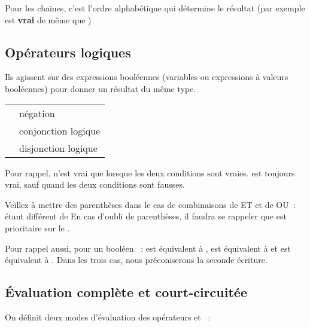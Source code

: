 		Pour les chaines, 
		c’est l’ordre alphabétique qui détermine le résultat 
		(par exemple
		 est \textbf{vrai} 
		de même que
		)

	\subsection{Opérateurs logiques}

		Ils agissent sur des expressions booléennes (variables ou expressions à
		valeurs booléennes) pour donner un résultat du même type.

		\begin{center}
		\begin{tabular}{m{1cm}|m{12cm}}
		\raggedleft \pseudocode{NON} & négation\\
		\raggedleft \pseudocode{ET} & conjonction logique\\
		\raggedleft \pseudocode{OU} & disjonction logique\\
		\end{tabular}
		\end{center}

		Pour rappel,  n’est vrai que lorsque
		les deux conditions sont vraies.  est
		toujours vrai, sauf quand les deux conditions sont fausses.

		Veillez à mettre des parenthèses dans le cas de combinaisons de ET et de
		OU~:  étant différent de
		 En cas
		d’oubli de parenthèses, il faudra se rappeler que
		 est prioritaire sur le .
		
		Pour rappel aussi, pour un booléen ~: 
		 est équivalent à ,
		 est équivalent à  et 
		 est équivalent à .
		Dans les trois cas, nous préconiserons la seconde écriture.

	\subsection{Évaluation complète et court-circuitée}

		On définit deux modes d’évaluation des opérateurs 
		et ~:

